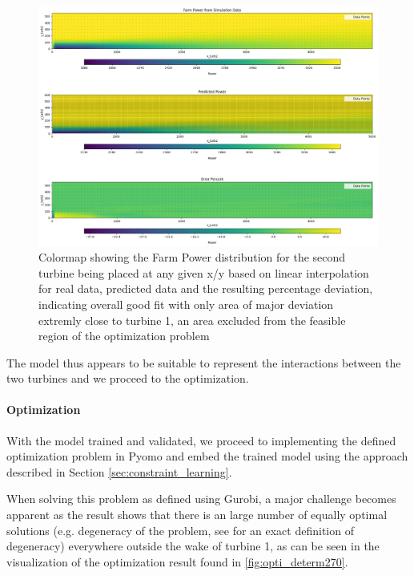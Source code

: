 \documentclass[preprint,12pt]{elsarticle}
\begin{document}
\begin{figure}[h] 
	\centering
	\includegraphics[width=1\textwidth]{../figures/optimization/determ_model_colormap.png} 
	\caption{Colormap showing the Farm Power distribution for the second turbine being placed at any given x/y based on linear interpolation for real data, predicted data and the resulting percentage deviation, indicating overall good fit with only area of major deviation extremly close to turbine 1, an area excluded from the feasible region of the optimization problem }
	\label{fig:determ_model_colormap}
\end{figure}

The model thus appears to be suitable to represent the interactions between the two turbines and we proceed to the optimization.

\paragraph{Optimization}


With the model trained and validated, we proceed to implementing the defined optimization problem in Pyomo  and embed the trained model using the approach described in Section \ref{sec:constraint_learning}.

When solving this problem as defined using Gurobi, a major challenge becomes apparent as the result shows that there is an large number of equally optimal solutions (e.g. degeneracy of the problem, see  \cite{vanderbei2020chapter3} for an exact definition of degeneracy) everywhere outside the wake of turbine 1, as can be seen  in the visualization of the optimization result found in \ref{fig:opti_determ270}.
\end{document}

